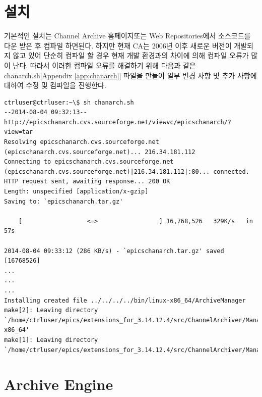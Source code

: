 \documentclass[11pt
  , a4paper
  , article
  , oneside
]{memoir}
\begin{document}
\chapter{설치}
기본적인 설치는 Channel Archive 홈페이지\citep{CA_HOME}또는 Web Repositories\citep{CA_SF}에서
소스코드를 다운 받은 후 컴파일 하면된다. 하지만 현재 CA는 2006년 이후 새로운 버전이 개발되지
않고 있어 단순히 컴파일 할 경우 현재 개발 환경과의 차이에 의해 컴파일 오류가 많이 난다.
따라서 이러한 컴파일 오류를 해결하기 위해 다음과 같은 chanarch.sh[Appendix \ref{app:chanarch}] 
파일을 만들어 일부 변경 사항 및 추가 사항에 대하여 수정 및 컴파일을 진행한다.
\begin{lstlisting}[style=termstyle]
ctrluser@ctrluser:~\$ sh chanarch.sh
--2014-08-04 09:32:13--  http://epicschanarch.cvs.sourceforge.net/viewvc/epicschanarch/?view=tar
Resolving epicschanarch.cvs.sourceforge.net (epicschanarch.cvs.sourceforge.net)... 216.34.181.112
Connecting to epicschanarch.cvs.sourceforge.net (epicschanarch.cvs.sourceforge.net)|216.34.181.112|:80... connected.
HTTP request sent, awaiting response... 200 OK
Length: unspecified [application/x-gzip]
Saving to: `epicschanarch.tar.gz'

    [                  <=>                 ] 16,768,526   329K/s   in 57s     

2014-08-04 09:33:12 (286 KB/s) - `epicschanarch.tar.gz' saved [16768526]
...
...
...
Installing created file ../../../../bin/linux-x86_64/ArchiveManager
make[2]: Leaving directory `/home/ctrluser/epics/extensions_for_3.14.12.4/src/ChannelArchiver/Manager/O.linux-x86_64'
make[1]: Leaving directory `/home/ctrluser/epics/extensions_for_3.14.12.4/src/ChannelArchiver/Manager'

\end{lstlisting}
 
\chapter{Archive Engine}
\end{document}
